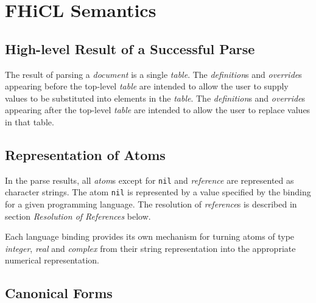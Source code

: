 \documentclass{memarticle}
\begin{document}
\chapter{FHiCL Semantics}{
        \section{High-level Result of a Successful Parse}
                
                The result of parsing a \emph{document}
                is a single \emph{table}.
                The \emph{definition}s and \emph{override}s
                appearing before the top-level \emph{table}
                are intended to allow the user
                to supply values to be substituted into elements in the \emph{table}.
                The \emph{definition}s and \emph{override}s
                appearing after the top-level \emph{table}
                are intended to allow the user
                to replace values in that table.

        \section{Representation of Atoms}
                In the parse results,
                all \emph{atom}s
                except for \texttt{nil} and \emph{reference}
                are represented
                as character strings.
                The atom \texttt{nil} is represented by a 
                value specified by the binding for a given programming language.
                The resolution of \emph{reference}s is described in section \emph{Resolution of References} below.
                \par
                Each language binding
                provides its own mechanism
                for turning atoms of type \emph{integer}, \emph{real} and \emph{complex}
                from their string representation
                into the appropriate numerical representation.
	\section{Canonical Forms}
}
\end{document}
